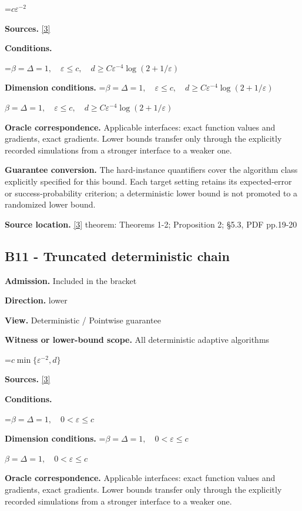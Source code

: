 \documentclass[10pt,a4paper]{article}
\newcommand{\AtlasMath}[1]{\par\begingroup\centering\setbox0=\hbox{$\displaystyle #1$}\ifdim\wd0>1.4\linewidth\typeout{ATLAS WIDE FORMULA: \the\wd0}\fi\ifdim\wd0>\linewidth\resizebox{\linewidth}{!}{\box0}\else\box0\fi\par\endgroup}
\newcommand{\AtlasInlineMath}[1]{\begingroup\setbox0=\hbox{$#1$}\ifdim\wd0>.4\linewidth\endgroup\AtlasMath{#1}\else\endgroup$#1$\fi}
\begin{document}
\AtlasMath{c\varepsilon^{-2}}
\textbf{Sources.} \href{https://arxiv.org/pdf/1710.11606}{[3]}

\textbf{Conditions.} 


\AtlasMath{\beta=\Delta=1,\quad\varepsilon\le c,\quad d\ge C\varepsilon^{-4}\log(2+1/\varepsilon)}




\textbf{Dimension conditions.} \AtlasInlineMath{\beta=\Delta=1,\quad\varepsilon\le c,\quad d\ge C\varepsilon^{-4}\log(2+1/\varepsilon)}

\textbf{Oracle correspondence.} Applicable interfaces: exact function values and gradients, exact gradients. Lower bounds transfer only through the explicitly recorded simulations from a stronger interface to a weaker one.

\textbf{Guarantee conversion.} The hard-instance quantifiers cover the algorithm class explicitly specified for this bound. Each target setting retains its expected-error or success-probability criterion; a deterministic lower bound is not promoted to a randomized lower bound.

\textbf{Source location.} \href{https://arxiv.org/pdf/1710.11606}{[3]} theorem: Theorems 1-2; Proposition 2; §5.3, PDF pp.19-20

\subsection{B11 - Truncated deterministic chain}
\textbf{Admission.} Included in the bracket

\textbf{Direction.} lower

\textbf{View.} Deterministic / Pointwise guarantee

\textbf{Witness or lower-bound scope.} All deterministic adaptive algorithms

\AtlasMath{c\min\{\varepsilon^{-2},d\}}
\textbf{Sources.} \href{https://arxiv.org/pdf/1710.11606}{[3]}

\textbf{Conditions.} 


\AtlasMath{\beta=\Delta=1,\quad0<\varepsilon\le c}




\textbf{Dimension conditions.} \AtlasInlineMath{\beta=\Delta=1,\quad0<\varepsilon\le c}

\textbf{Oracle correspondence.} Applicable interfaces: exact function values and gradients, exact gradients. Lower bounds transfer only through the explicitly recorded simulations from a stronger interface to a weaker one.
\end{document}

